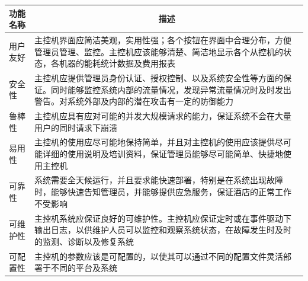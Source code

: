 \documentclass[blue,normal,cn]{elegantnote}
\begin{document}
\begin{center}
	\begin{tabular}{|>{\centering}m{}|m{}|}
		\hline
		\textbf{功能名称} & \multicolumn{1}{c|}{\textbf{描述}}                                                                                                                                                                                                         \\
		\hline
		用户友好          & 主控机界面应简洁美观，实用性强；各个按钮在界面中合理分布，方便管理员管理、监控。主控机应该能够清楚、简洁地显示各个从控机的状态，各机器的能耗统计数据及费用报表                                                                             \\
		\hline
		安全性            & 主控机应提供管理员身份认证、授权控制、以及系统安全性等方面的保证。同时能够监控系统内部的流量情况，发现异常流量情况时及时发出警告。对系统外部及内部的潜在攻击有一定的防御能力                                                               \\
		\hline
		鲁棒性            & 主控机应具有应对可能的并发大规模请求的能力，保证系统不会在大量用户的同时请求下崩溃                                                                                                                                                         \\
		\hline
		易用性            & 主控机的使用应尽可能地保持简单，并且对主控机的使用应该提供尽可能详细的使用说明及培训资料，保证管理员能够尽可能简单、快捷地使用主控机                                                                                                       \\
		\hline
		可靠性            & 系统需要全天候运行，并且要求能快速部署，特别是在系统出现故障时，能够快速告知管理员，并能够提供应急服务，保证酒店的正常工作不受影响                                                                                                         \\
		\hline
		可维护性          & 主控机系统应保证良好的可维护性。主控机应保证定时或在事件驱动下输出日志，以供维护人员可以监控和观察系统状态，在故障发生时及时的监测、诊断以及修复系统                                                                                       \\
		\hline
		可配置性          & 主控机的参数应该是可配置的，以使其可以通过不同的配置文件灵活部署于不同的平台及系统                                                                                                                                                         \\

\end{tabular}
\end{center}
\end{document}
